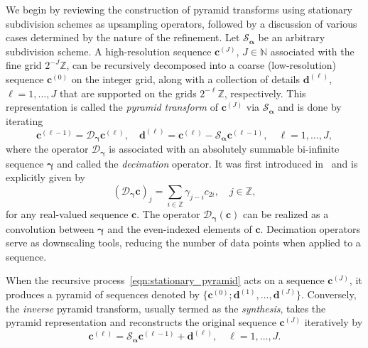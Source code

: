 \documentclass[11pt,a4paper]{article}
\theoremstyle{definition}
\begin{document}
We begin by reviewing the construction of pyramid transforms using stationary subdivision schemes as upsampling operators, followed by a discussion of various cases determined by the nature of the refinement. Let $\mathcal{S}_{\boldsymbol{\alpha}}$ be an arbitrary subdivision scheme. A high-resolution sequence $\boldsymbol{c}^{(J)}$, $J \in \mathbb{N}$ associated with the fine grid $2^{-J}\mathbb{Z}$, can be recursively decomposed into a coarse (low-resolution) sequence $\boldsymbol{c}^{(0)}$ on the integer grid, along with a collection of details $\boldsymbol{d}^{(\ell)}$, $\ell=1,\dots,J$ that are supported on the grids $2^{-\ell}\mathbb{Z}$, respectively. This representation is called the \emph{pyramid transform} of $\boldsymbol{c}^{(J)}$ via $\mathcal{S}_{\boldsymbol{\alpha}}$ and is done by iterating
\begin{equation} \label{eqn:stationary_pyramid}
    \boldsymbol{c}^{(\ell-1)}=\mathcal{D}_{\boldsymbol{\gamma}}\boldsymbol{c}^{(\ell)}, \quad \boldsymbol{d}^{(\ell)}=\boldsymbol{c}^{(\ell)}-\mathcal{S}_{\boldsymbol{\alpha}}\boldsymbol{c}^{(\ell-1)}, \quad \ell=1,\dots,J,
\end{equation}
where the operator $\mathcal{D}_{\boldsymbol{\gamma}}$ is associated with an absolutely summable bi-infinite sequence $\boldsymbol{\gamma}$ and called the \emph{decimation} operator. It was first introduced in~\cite{dyn2021linear} and is explicitly given by 
\begin{equation}\label{decimation operator}
    (\mathcal{D}_{\boldsymbol{\gamma}}\boldsymbol{c})_j = \sum_{i \in \mathbb{Z}}\gamma_{j-i}c_{2i}, \quad j\in \mathbb{Z},
\end{equation}
for any real-valued sequence $\boldsymbol{c}$. The operator $\mathcal{D}_{\boldsymbol{\gamma}}(\boldsymbol{c})$ can be realized as a convolution between $\boldsymbol{\gamma}$ and the even-indexed elements of $\boldsymbol{c}$. Decimation operators serve as downscaling tools, reducing the number of data points when applied to a sequence.

When the recursive process~\eqref{eqn:stationary_pyramid} acts on a sequence $\boldsymbol{c}^{(J)}$, it produces a pyramid of sequences denoted by $\{\boldsymbol{c}^{(0)}; \boldsymbol{d}^{(1)}, \dots, \boldsymbol{d}^{(J)}\}$. Conversely, the \emph{inverse} pyramid transform, usually termed as the \emph{synthesis}, takes the pyramid representation and reconstructs the original sequence $\boldsymbol{c}^{(J)}$ iteratively by
\begin{equation} \label{synthesis}
    \boldsymbol{c}^{(\ell)}= \mathcal{S}_{\boldsymbol{\alpha}}\boldsymbol{c}^{(\ell-1)}+\boldsymbol{d}^{(\ell)}, \quad \ell=1,\dots,J.
\end{equation}
\end{document}
